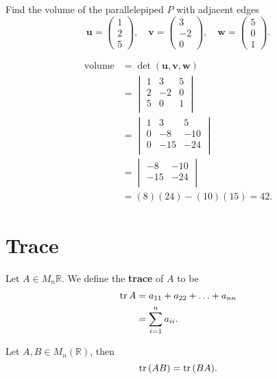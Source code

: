 \begin{example}
    Find the volume of the parallelepiped $P$ with adjacent edges
    \[
        \bm u=
        \begin{pmatrix}
            1\\2\\5
        \end{pmatrix}
        ,\quad\bm v=
        \begin{pmatrix}
            3\\-2\\0
        \end{pmatrix}
        ,\quad\bm w=
        \begin{pmatrix}
            5\\0\\1
        \end{pmatrix}
        .
    \]
    
    \begin{align*}
        \text{volume}&=\det{(\bm u,\bm v,\bm w)}\\
        &=
        \begin{vmatrix}
            1&3&5\\
            2&-2&0\\
            5&0&1\\
        \end{vmatrix}
        \\
        &=
        \begin{vmatrix}
            1&3&5\\
            0&-8&-10\\
            0&-15&-24\\
        \end{vmatrix}
        \\
        &=
        \begin{vmatrix}
            -8&-10\\
            -15&-24\\
        \end{vmatrix}
        \\
        &=(8)(24)-(10)(15)=42.
    \end{align*}
\end{example}

\section{Trace}

\begin{definition}
    Let $A\in M_n{\mathbb R}$. We define the \textbf{trace} of $A$ to be 
    \begin{align*}
        \operatorname{tr}{A}&=a_{11}+a_{22}+\ldots+a_{nn}\\
        &=\sum_{i=1}^{n}{a_{ii}}.
    \end{align*}
\end{definition}

\begin{lemma}
    Let $A,B\in M_n(\mathbb R)$, then \[\operatorname{tr}{(AB)}=\operatorname{tr}{(BA)}.\]
\end{lemma}

